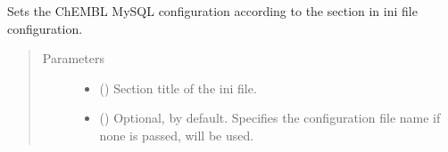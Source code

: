 \documentclass[letterpaper,10pt,english]{sphinxmanual}
\begin{document}
\begin{fulllineitems}

\begin{fulllineitems}
\label{\detokenize{main:pypath.main.PyPath.set_boolean_vattr}}
\end{fulllineitems}


\begin{fulllineitems}
\label{\detokenize{main:pypath.main.PyPath.set_categories}}
\end{fulllineitems}


\begin{fulllineitems}
\label{\detokenize{main:pypath.main.PyPath.set_chembl_mysql}}
Sets the ChEMBL MySQL configuration according to the 
section in  ini file configuration.
\begin{quote}\begin{description}
\item[{Parameters}] \leavevmode\begin{itemize}
\item {} 
 () \textendash{} Section title of the ini file.

\item {} 
 () \textendash{} Optional,  by default. Specifies the configuration
file name if none is passed, 
will be used.

\end{itemize}

\end{description}\end{quote}

\end{fulllineitems}



\end{fulllineitems}
\end{document}
